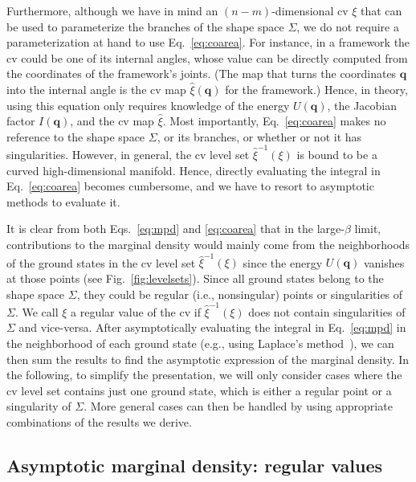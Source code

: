 Furthermore, although we have in mind an $(n-m)$-dimensional \ac{cv} $\xi$ that can be used to parameterize the branches of the shape space $\Sigma$, we do not require a parameterization at hand to use Eq.~\eqref{eq:coarea}.
For instance, in a framework the \ac{cv} could be one of its internal angles, whose value can be directly computed from the coordinates of the framework's joints.
(The map that turns the coordinates $\bm{q}$ into the internal angle is the \ac{cv} map $\hat{\xi}(\bm{q})$ for the framework.)
Hence, in theory, using this equation only requires knowledge of the energy $U(\bm{q})$, the Jacobian factor $I(\bm{q})$, and the \ac{cv} map $\hat{\xi}$.
Most importantly, Eq.~\eqref{eq:coarea} makes no reference to the shape space $\Sigma$, or its branches, or whether or not it has singularities.
However, in general, the \ac{cv} level set $\hat{\xi}^{-1}(\xi)$ is bound to be a curved high-dimensional manifold.
Hence, directly evaluating the integral in Eq.~\eqref{eq:coarea} becomes cumbersome, and we have to resort to asymptotic methods to evaluate it.

It is clear from both Eqs.~\eqref{eq:mpd} and \eqref{eq:coarea} that in the large-$\beta$ limit, contributions to the marginal density would mainly come from the neighborhoods of the ground states in the \ac{cv} level set $\hat{\xi}^{-1}(\xi)$ since the energy $U(\bm{q})$ vanishes at those points (see Fig.~\ref{fig:levelsets}).
Since all ground states belong to the shape space $\Sigma$, they could be regular (i.e., nonsingular) points or singularities of $\Sigma$.
We call $\xi$ a regular value of the \ac{cv} if $\hat{\xi}^{-1}(\xi)$ does not contain singularities of $\Sigma$ and vice-versa.
After asymptotically evaluating the integral in Eq.~\eqref{eq:mpd} in the neighborhood of each ground state (e.g., using Laplace's method~\cite{breitung1994}), we can then sum the results to find the asymptotic expression of the marginal density.
In the following, to simplify the presentation, we will only consider cases where the \ac{cv} level set contains just one ground state, which is either a regular point or a singularity of $\Sigma$.
More general cases can then be handled by using appropriate combinations of the results we derive.

\subsection{Asymptotic marginal density: regular values}
\label{sec:regular}


